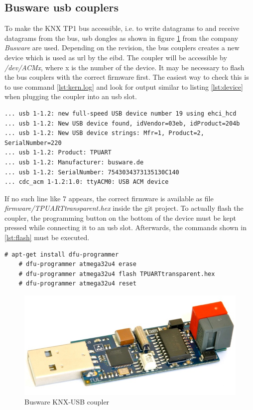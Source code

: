\subsection{Busware \gls{usb} couplers}

To make the KNX TP1 bus accessible, i.e. to write datagrams to and receive datagrams from the bus, \gls{usb} dongles as shown in figure \ref{fig:busware}
from the company \textit{Busware} are used. Depending on the revision, the bus couplers creates a new device which is used as \gls{url} by the \gls{eibd}.
The coupler will be accessible by \textit{/dev/ACMx}, where x is the number of the device. It may be necessary to flash the bus couplers with the correct
firmware first. The easiest way to check this is to use command \ref{lst:kern.log} and look for output similar to listing \ref{lst:device} when plugging 
the coupler into an \gls{usb} slot.

\begin{lstlisting}[style=BashInputStyle,label=lst:device]
... usb 1-1.2: new full-speed USB device number 19 using ehci_hcd
... usb 1-1.2: New USB device found, idVendor=03eb, idProduct=204b
... usb 1-1.2: New USB device strings: Mfr=1, Product=2, SerialNumber=220
... usb 1-1.2: Product: TPUART
... usb 1-1.2: Manufacturer: busware.de
... usb 1-1.2: SerialNumber: 7543034373135130C140
... cdc_acm 1-1.2:1.0: ttyACM0: USB ACM device
\end{lstlisting}

If no such line like 7 appears, the correct firmware is available as file \textit{firmware/TPUARTtransparent.hex} inside the git project. To actually flash the 
coupler, the programming button on the bottom of the device must be kept pressed while connecting it to an \gls{usb} slot. Afterwards, the commands shown
in \ref{lst:flash} must be executed.

\begin{lstlisting}[style=BashInputStyle,label=lst:flash]
    # apt-get install dfu-programmer
    # dfu-programmer atmega32u4 erase
    # dfu-programmer atmega32u4 flash TPUARTtransparent.hex
    # dfu-programmer atmega32u4 reset
\end{lstlisting}


\begin{figure}
    \centering
    \caption{Busware KNX-USB coupler}
    \label{fig:busware}
\includegraphics[scale=0.2]{figures/busware.png}
\end{figure}

